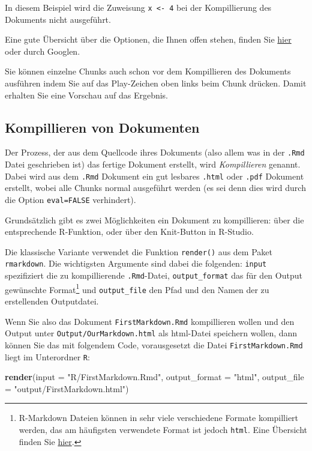 \documentclass[]{book}
\newenvironment{Shaded}{\begin{snugshade}}{\end{snugshade}}
\newcommand{\KeywordTok}[1]{\textcolor[rgb]{0.13,0.29,0.53}{\textbf{#1}}}
\newcommand{\DataTypeTok}[1]{\textcolor[rgb]{0.13,0.29,0.53}{#1}}
\newcommand{\StringTok}[1]{\textcolor[rgb]{0.31,0.60,0.02}{#1}}
\newcommand{\NormalTok}[1]{#1}
\let\rmarkdownfootnote\footnote%
\def\footnote{\protect\rmarkdownfootnote}
\begin{document}
In diesem Beispiel wird die Zuweisung \texttt{x\ \textless{}-\ 4} bei
der Kompillierung des Dokuments nicht ausgeführt.

Eine gute Übersicht über die Optionen, die Ihnen offen stehen, finden
Sie
\href{https://rstudio.com/wp-content/uploads/2015/03/rmarkdown-reference.pdf}{hier}
oder durch Googlen.

Sie können einzelne Chunks auch schon vor dem Kompillieren des Dokuments
ausführen indem Sie auf das Play-Zeichen oben links beim Chunk drücken.
Damit erhalten Sie eine Vorschau auf das Ergebnis.

\subsection{Kompillieren von
Dokumenten}\label{kompillieren-von-dokumenten}

Der Prozess, der aus dem Quellcode ihres Dokuments (also allem was in
der \texttt{.Rmd} Datei geschrieben ist) das fertige Dokument erstellt,
wird \emph{Kompillieren} genannt. Dabei wird aus dem \texttt{.Rmd}
Dokument ein gut lesbares \texttt{.html} oder \texttt{.pdf} Dokument
erstellt, wobei alle Chunks normal ausgeführt werden (es sei denn dies
wird durch die Option \texttt{eval=FALSE} verhindert).

Grundsätzlich gibt es zwei Möglichkeiten ein Dokument zu kompillieren:
über die entsprechende R-Funktion, oder über den Knit-Button in
R-Studio.

Die klassische Variante verwendet die Funktion \texttt{render()} aus dem
Paket \texttt{rmarkdown}. Die wichtigsten Argumente sind dabei die
folgenden: \texttt{input} spezifiziert die zu kompillierende
\texttt{.Rmd}-Datei, \texttt{output\_format} das für den Output
gewünschte Format\footnote{R-Markdown Dateien können in sehr viele
  verschiedene Formate kompilliert werden, das am häufigsten verwendete
  Format ist jedoch \texttt{html}. Eine Übersicht finden Sie
  \href{https://bookdown.org/yihui/rmarkdown/output-formats.html}{hier}.}
und \texttt{output\_file} den Pfad und den Namen der zu erstellenden
Outputdatei.

Wenn Sie also das Dokument \texttt{FirstMarkdown.Rmd} kompillieren
wollen und den Output unter \texttt{Output/OurMarkdown.html} als
html-Datei speichern wollen, dann können Sie das mit folgendem Code,
vorausgesetzt die Datei \texttt{FirstMarkdown.Rmd} liegt im Unterordner
\texttt{R}:

\begin{Shaded}
\begin{Highlighting}[]
\KeywordTok{render}\NormalTok{(}\DataTypeTok{input =} \StringTok{"R/FirstMarkdown.Rmd"}\NormalTok{, }
       \DataTypeTok{output_format =} \StringTok{"html"}\NormalTok{, }
       \DataTypeTok{output_file =} \StringTok{"output/FirstMarkdown.html"}\NormalTok{)}
\end{Highlighting}
\end{Shaded}
\end{document}
